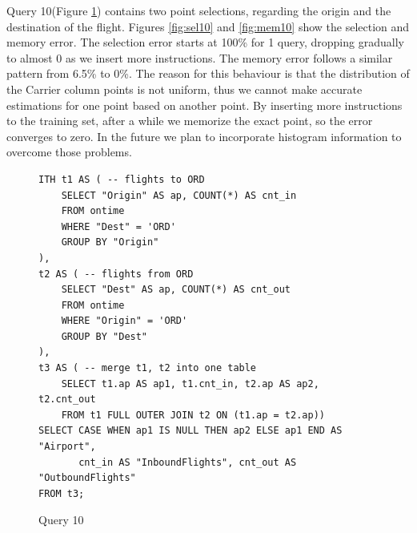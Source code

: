 Query 10(Figure \ref{sel:sql10}) contains two point selections,
regarding the origin and the destination of the flight. Figures \ref{fig:sel10}
and \ref{fig:mem10} show the selection and memory error. The selection error
starts at 100\% for 1 query, dropping gradually to almost 0 as we insert more
instructions. The memory error follows a similar pattern from 6.5\% to 0\%.
The reason for this behaviour is that the distribution of the
Carrier column points is not uniform, thus we cannot make accurate estimations
for one point based on another point. By inserting more instructions to the
training set, after a while we memorize the exact point, so the error converges
to zero. In the future we plan to incorporate histogram information
to overcome those problems.


\begin{figure}[htb!]
\begin{lstlisting}[frame=single]
ITH t1 AS ( -- flights to ORD
    SELECT "Origin" AS ap, COUNT(*) AS cnt_in
    FROM ontime
    WHERE "Dest" = 'ORD'
    GROUP BY "Origin"
),
t2 AS ( -- flights from ORD
    SELECT "Dest" AS ap, COUNT(*) AS cnt_out
    FROM ontime
    WHERE "Origin" = 'ORD'
    GROUP BY "Dest"
),
t3 AS ( -- merge t1, t2 into one table
    SELECT t1.ap AS ap1, t1.cnt_in, t2.ap AS ap2, t2.cnt_out
    FROM t1 FULL OUTER JOIN t2 ON (t1.ap = t2.ap))
SELECT CASE WHEN ap1 IS NULL THEN ap2 ELSE ap1 END AS "Airport",
       cnt_in AS "InboundFlights", cnt_out AS "OutboundFlights"
FROM t3;
\end{lstlisting}
  \caption{Query 10}
  \label{sel:sql10}
\end{figure}

